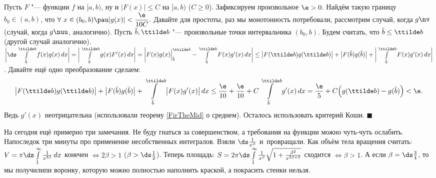 \documentclass[a4paper,10pt,twoside]{article}
\newenvironment{Proof}
       {\par\noindent{\textbf{Доказательство.}}}
       {\hfill$\scriptstyle\blacksquare$}
\begin{document}
	\begin{Proof}
	Пусть $F$ "--- \tp{} функции $f$ на $[a,b)$, ну и $|F(x)|\leq C$ на $[a,b)$ ($C\geq 0$). Зафиксируем произвольное $\e>0$.
	Найдём такую границу $b_0\in(a,b)$, что $\forall\  x\in(b_0,b)\pau |g(x)|<\dfrac{\e}{10C}.$ Давайте для простоты, раз мы монотонность потребовали,
	рассмотрим случай, когда $g\nv$ (случай, когда $g\nuu$, аналогично). Пусть $\tilde b,\ttilde b$ "--- произвольные точки интервальчика $(b_0,b)$.
	Будем считать, что $\tilde b\leq \ttilde b$ (другой случай аналогично).
	$\bigg|\ds\int\limits_{\tilde b}^{\ttilde b}f(x)g(x)\,dx\bigg|=\bigg|\int\limits_{\tilde b}^{\ttilde b}g(x)F'(x)\,dx\bigg|=
	\bigg|F(x)g(x)\Big|_{\tilde b}^{\ttilde b}-\int\limits_{\tilde b}^{\ttilde b}F(x)g'(x)\,dx\bigg|\leq \big|F(\ttilde b)g(\ttilde b)\big|+
	\big|F(\tilde b)g(\tilde b)\big|+\bigg|\int\limits_{\tilde b}^{\ttilde b}F(x)g'(x)\,dx\bigg|$.
	Давайте ещё одно преобразование сделаем:
	\[\big|F(\ttilde b)g(\ttilde b)\big|+\big|F(\tilde b)g(\tilde b)\big|+\int\limits_{\tilde b}^{\ttilde b}\big|F(x)g'(x)\big|\,dx\leq\frac{\e}{10}+\frac{\e}{10}+C\int\limits_{\tilde b}^{\ttilde b}g'(x)\,dx=\frac{\e}5+C\Big(g(\ttilde b)-g(\tilde b)\Big)<\e.\]
	Ведь $g'(x)$ неотрицательна (использовали теорему \ref{FirTheMid} о среднем). Осталось использовать критерий Коши.
	\end{Proof}
	
	На сегодня ещё примерно три замечания. Не буду гнаться за совершенством, а требования на функции можно чуть-чуть ослабить. Напоследок три минуты про применение несобственных интегралов.
	Взяли $\ds\frac1{x^\beta}$  и~провращали. Как объём тела вращения считать: $V=\pi\ds\int\limits_1^\infty\frac1{x^{2\beta}}\,dx$ конечен $\iff2\beta>1$ ($\beta>\ds\frac12$).
	Теперь площадь: $S=2\pi\ds\int\limits_1^\infty\frac1{x^\beta}\sqrt{1+\frac{\beta^2}{x^{2\beta+2}}}$ сходится $\iff\beta>1$. А если $\beta=\ds\frac34$, то
	мы получилипи воронку, которую можно полностью наполнить краской, а покрасить стенки нельзя.
	
\end{document}

